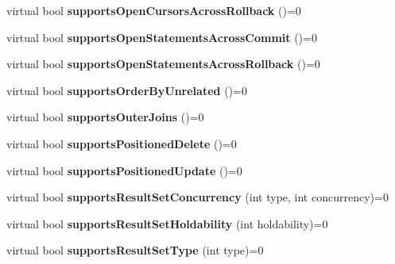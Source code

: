 \begin{DoxyCompactItemize}
virtual bool {\bfseries supports\+Open\+Cursors\+Across\+Rollback} ()=0
\item 
\hypertarget{classsql_1_1_database_meta_data_aac6a9390821193b47313fadf74bbcf8b}{}\label{classsql_1_1_database_meta_data_aac6a9390821193b47313fadf74bbcf8b} 
virtual bool {\bfseries supports\+Open\+Statements\+Across\+Commit} ()=0
\item 
\hypertarget{classsql_1_1_database_meta_data_af0afa123597ea0fe9bd125d013928d7d}{}\label{classsql_1_1_database_meta_data_af0afa123597ea0fe9bd125d013928d7d} 
virtual bool {\bfseries supports\+Open\+Statements\+Across\+Rollback} ()=0
\item 
\hypertarget{classsql_1_1_database_meta_data_a4d53f10472738a68db148222c2c7cc6b}{}\label{classsql_1_1_database_meta_data_a4d53f10472738a68db148222c2c7cc6b} 
virtual bool {\bfseries supports\+Order\+By\+Unrelated} ()=0
\item 
\hypertarget{classsql_1_1_database_meta_data_a431ddcfa6b9bf00d993015887f691892}{}\label{classsql_1_1_database_meta_data_a431ddcfa6b9bf00d993015887f691892} 
virtual bool {\bfseries supports\+Outer\+Joins} ()=0
\item 
\hypertarget{classsql_1_1_database_meta_data_a2312feb6b6b34bc9140d0947f3875251}{}\label{classsql_1_1_database_meta_data_a2312feb6b6b34bc9140d0947f3875251} 
virtual bool {\bfseries supports\+Positioned\+Delete} ()=0
\item 
\hypertarget{classsql_1_1_database_meta_data_a7bb818cbbbe9c034892d37977eba64cb}{}\label{classsql_1_1_database_meta_data_a7bb818cbbbe9c034892d37977eba64cb} 
virtual bool {\bfseries supports\+Positioned\+Update} ()=0
\item 
\hypertarget{classsql_1_1_database_meta_data_a512f7201ae80f4f49d689cc471fd7b30}{}\label{classsql_1_1_database_meta_data_a512f7201ae80f4f49d689cc471fd7b30} 
virtual bool {\bfseries supports\+Result\+Set\+Concurrency} (int type, int concurrency)=0
\item 
\hypertarget{classsql_1_1_database_meta_data_a6628231053f4e28e641d916f1d40fd4f}{}\label{classsql_1_1_database_meta_data_a6628231053f4e28e641d916f1d40fd4f} 
virtual bool {\bfseries supports\+Result\+Set\+Holdability} (int holdability)=0
\item 
\hypertarget{classsql_1_1_database_meta_data_a42161de14a12a9fb7eefa4e694fea547}{}\label{classsql_1_1_database_meta_data_a42161de14a12a9fb7eefa4e694fea547} 
virtual bool {\bfseries supports\+Result\+Set\+Type} (int type)=0
\item 
\hypertarget{classsql_1_1_database_meta_data_a908aedb30e4f39f8a26fc0501de64d37}{}\label{classsql_1_1_database_meta_data_a908aedb30e4f39f8a26fc0501de64d37} 

\end{DoxyCompactItemize}
